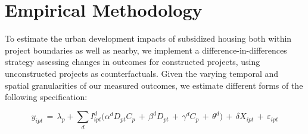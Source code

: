 \documentclass[12pt]{article}
\begin{document}


\section{Empirical Methodology}\label{section:methodology}

To estimate the urban development impacts of subsidized housing both within project boundaries as well as nearby, we implement a difference-in-differences strategy assessing changes in outcomes for constructed projects, using unconstructed projects as counterfactuals. Given the varying temporal and spatial granularities of our measured outcomes, we estimate different forms of the following specification:

\begin{equation}
y_{ipt} \, = \, \lambda_p + \sum\limits_{d} I^d_{ipt}\Big( \alpha^d D_{pt}C_{p} \, + \, \beta^dD_{pt} \, + \, \gamma^dC_{p} \, + \, \theta^{d} \Big) \, + \, \delta X_{ipt} \, + \, \varepsilon_{ipt}
\end{equation}
\end{document}
